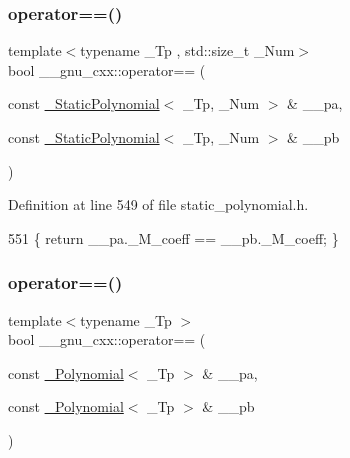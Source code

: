 \subsubsection{\texorpdfstring{operator==()}{operator==()}\hspace{0.1cm}{\footnotesize\ttfamily [2/3]}}
{\footnotesize\ttfamily template$<$typename \+\_\+\+Tp , std\+::size\+\_\+t \+\_\+\+Num$>$ \\
bool \+\_\+\+\_\+gnu\+\_\+cxx\+::operator== (\begin{DoxyParamCaption}\item[{const \hyperlink{class____gnu__cxx_1_1__StaticPolynomial}{\+\_\+\+Static\+Polynomial}$<$ \+\_\+\+Tp, \+\_\+\+Num $>$ \&}]{\+\_\+\+\_\+pa,  }\item[{const \hyperlink{class____gnu__cxx_1_1__StaticPolynomial}{\+\_\+\+Static\+Polynomial}$<$ \+\_\+\+Tp, \+\_\+\+Num $>$ \&}]{\+\_\+\+\_\+pb }\end{DoxyParamCaption})\hspace{0.3cm}{\ttfamily [inline]}}



Definition at line 549 of file static\+\_\+polynomial.\+h.


\begin{DoxyCode}
551     \{ \textcolor{keywordflow}{return} \_\_pa.\_M\_coeff == \_\_pb.\_M\_coeff; \}
\end{DoxyCode}
\mbox{\label{namespace____gnu__cxx_a7427db234bb8c8aab722a3196e898215}} 
\subsubsection{\texorpdfstring{operator==()}{operator==()}\hspace{0.1cm}{\footnotesize\ttfamily [3/3]}}
{\footnotesize\ttfamily template$<$typename \+\_\+\+Tp $>$ \\
bool \+\_\+\+\_\+gnu\+\_\+cxx\+::operator== (\begin{DoxyParamCaption}\item[{const \hyperlink{class____gnu__cxx_1_1__Polynomial}{\+\_\+\+Polynomial}$<$ \+\_\+\+Tp $>$ \&}]{\+\_\+\+\_\+pa,  }\item[{const \hyperlink{class____gnu__cxx_1_1__Polynomial}{\+\_\+\+Polynomial}$<$ \+\_\+\+Tp $>$ \&}]{\+\_\+\+\_\+pb }\end{DoxyParamCaption})\hspace{0.3cm}{\ttfamily [inline]}}


